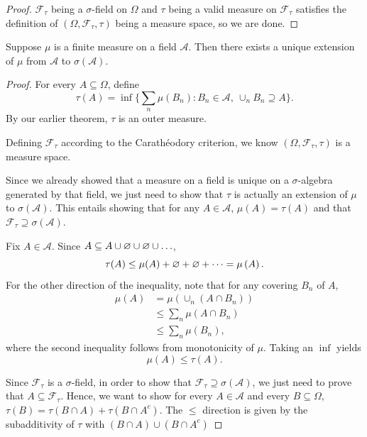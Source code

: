 \begin{proof}
	$\mathscr{F}_\tau$ being a $\sigma$-field on $\Omega$ and $\tau$ being a valid measure on $\mathscr{F}_\tau$ satisfies the definition of $(\Omega, \mathscr{F}_\tau, \tau)$ being a measure space, so we are done.
\end{proof}

\begin{theorem}
	Suppose $\mu$ is a finite measure on a field $\mathscr{A}$. Then there exists a unique extension of $\mu$ from $\mathscr{A}$ to $\sigma(\mathscr{A})$.
\end{theorem}

\begin{proof}
	For every $A \subseteq \Omega$, define \[
		\tau(A) = \inf \{\sum_n \mu(B_n): B_n \in \mathscr{A},\ \cup_n B_n \supseteq A\}
	.\] By our earlier theorem, $\tau$ is an outer measure.

	Defining $\mathscr{F}_\tau$ according to the Carath\'eodory criterion, we know $(\Omega, \mathscr{F}_\tau, \tau)$ is a measure space.

	Since we already showed that a measure on a field is unique on a $\sigma$-algebra generated by that field, we just need to show that $\tau$ is actually an extension of $\mu$ to $\sigma(\mathscr{A})$. This entails showing that for any $A \in \mathscr{A}$, $\mu(A) = \tau(A)$ and that $\mathscr{F}_\tau \supseteq  \sigma(\mathscr{A})$.

	Fix $A \in \mathscr{A}$. Since $A \subseteq A \cup \varnothing \cup \varnothing \cup \ldots$, \[
		\tau(A) \le \mu(A) + \varnothing + \varnothing + \cdots = \mu\left(A \right)
	.\] For the other direction of the inequality, note that for any covering $B_n$ of $A$, 
	\begin{align*}
		\mu(A) &= \mu\left( \cup_n \left( A \cap B_n \right) \right) \\
			   &\le \sum_n \mu(A \cap B_n) \\
			   &\le \sum_n \mu(B_n)
	,\end{align*}
	where the second inequality follows from monotonicity of $\mu$.
	Taking an $\inf$ yields \[
		\mu(A) \le \tau(A)
	.\] 

	Since $\mathscr{F}_\tau$ is a $\sigma$-field, in order to show that $\mathscr{F}_\tau \supseteq \sigma(\mathscr{A})$, we just need to prove that $A \subseteq \mathscr{F}_\tau$. Hence, we want to show for every $A \in \mathscr{A}$ and every $B \subseteq \Omega$, $\tau(B) = \tau(B \cap A) + \tau(B \cap A^{c})$. The $\le$ direction is given by the subadditivity of $\tau$ with $\left( B \cap A \right) \cup \left( B \cap A^{c} \right)$


\end{proof}
